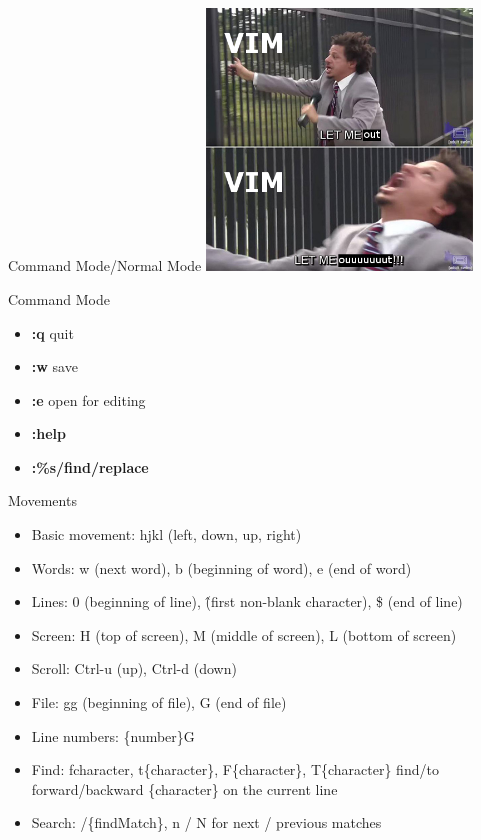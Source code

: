 \documentclass[10pt]{beamer}
\begin{document}
\begin{frame}{Command Mode/Normal Mode}
  \includegraphics[width=200pt]{vim-exit.jpg}
\end{frame}

\begin{frame}{Command Mode}
  \begin{itemize}
    \item \textbf{:q} quit
    \item \textbf{:w} save
    \item \textbf{:e} open for editing
    \item \textbf{:help}
    \item \textbf{:\%s/find/replace}
  \end{itemize}
\end{frame}

\begin{frame}{Movements}
\begin{itemize}
  \item Basic movement: hjkl (left, down, up, right)
  \item Words: w (next word), b (beginning of word), e (end of word)
  \item Lines: 0 (beginning of line), \^ (first non-blank character), \$ (end of line)
  \item Screen: H (top of screen), M (middle of screen), L (bottom of screen)
  \item Scroll: Ctrl-u (up), Ctrl-d (down)
  \item File: gg (beginning of file), G (end of file)
  \item Line numbers: \{number\}G
  \item Find: f{character}, t\{character\}, F\{character\}, T\{character\}
  find/to forward/backward \{character\} on the current line
  \item Search: /\{findMatch\}, n / N for next / previous matches
\end{itemize}
\end{frame}
\end{document}
